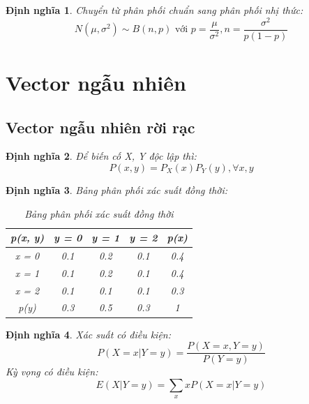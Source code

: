\documentclass[12pt]{article}
\newtheorem{thm}{Định nghĩa}
\begin{document}
\begin{thm}
    Chuyển từ phân phối chuẩn sang phân phối nhị thức:
    \begin{equation}
        N(\mu, \sigma^2) \sim B(n, p) \text{ với } p = \frac{\mu}{\sigma^2}, n = \frac{\sigma^2}{p(1 - p)}
    \end{equation}

\end{thm}

\section {Vector ngẫu nhiên}
\subsection{Vector ngẫu nhiên rời rạc}

\begin{thm}
    Để biến cố X, Y độc lập thì:
    \begin{equation}
        P(x, y) = P_X (x)P_Y (y) , \forall x, y
    \end{equation}
\end{thm}

\begin{thm}
    Bảng phân phối xác suất đồng thời:
    \begin{table}[h!]
        \centering
        \begin{tabular}{|c|c|c|c|c|}
            \hline
            p(x, y) & y = 0 & y = 1 & y = 2 & p(x) \\
            \hline
            x = 0 & 0.1 & 0.2 & 0.1 & 0.4 \\
            \hline
            x = 1 & 0.1 & 0.2 & 0.1 & 0.4 \\
            \hline
            x = 2 & 0.1 & 0.1 & 0.1 & 0.3 \\
            \hline
            p(y) & 0.3 & 0.5 & 0.3 & 1 \\
            \hline
        \end{tabular}
        \caption{Bảng phân phối xác suất đồng thời}
        \label{tab:ppx}
    \end{table}
\end{thm}

\begin{thm}
    Xác suất có điều kiện:
    \begin{equation}
        P(X = x | Y = y) = \frac{P(X = x, Y = y)}{P(Y = y)}
    \end{equation}
    Kỳ vọng có điều kiện:
    \begin{equation}
        E(X | Y = y) = \sum_{x} xP(X = x | Y = y)
    \end{equation}
\end{thm}
\end{document}
